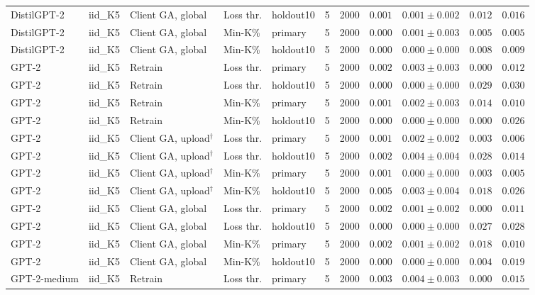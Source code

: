 \begin{table}[t]
\begin{tabular*}{\textwidth}{@{\extracolsep{\fill}}lllllcccccc@{}}
DistilGPT-2 & iid\_K5 & Client GA, global & Loss thr. & holdout10 & 5 & 2000 & $0.001$ & $0.001 \pm 0.002$ & $0.012$ & $0.016$ \\
DistilGPT-2 & iid\_K5 & Client GA, global & Min-K\% & primary & 5 & 2000 & $0.000$ & $0.001 \pm 0.003$ & $0.005$ & $0.005$ \\
DistilGPT-2 & iid\_K5 & Client GA, global & Min-K\% & holdout10 & 5 & 2000 & $0.000$ & $0.000 \pm 0.000$ & $0.008$ & $0.009$ \\
GPT-2 & iid\_K5 & Retrain & Loss thr. & primary & 5 & 2000 & $0.002$ & $0.003 \pm 0.003$ & $0.000$ & $0.012$ \\
GPT-2 & iid\_K5 & Retrain & Loss thr. & holdout10 & 5 & 2000 & $0.000$ & $0.000 \pm 0.000$ & $0.029$ & $0.030$ \\
GPT-2 & iid\_K5 & Retrain & Min-K\% & primary & 5 & 2000 & $0.001$ & $0.002 \pm 0.003$ & $0.014$ & $0.010$ \\
GPT-2 & iid\_K5 & Retrain & Min-K\% & holdout10 & 5 & 2000 & $0.000$ & $0.000 \pm 0.000$ & $0.000$ & $0.026$ \\
GPT-2 & iid\_K5 & Client GA, upload$^{\dagger}$ & Loss thr. & primary & 5 & 2000 & $0.001$ & $0.002 \pm 0.002$ & $0.003$ & $0.006$ \\
GPT-2 & iid\_K5 & Client GA, upload$^{\dagger}$ & Loss thr. & holdout10 & 5 & 2000 & $0.002$ & $0.004 \pm 0.004$ & $0.028$ & $0.014$ \\
GPT-2 & iid\_K5 & Client GA, upload$^{\dagger}$ & Min-K\% & primary & 5 & 2000 & $0.001$ & $0.000 \pm 0.000$ & $0.003$ & $0.005$ \\
GPT-2 & iid\_K5 & Client GA, upload$^{\dagger}$ & Min-K\% & holdout10 & 5 & 2000 & $0.005$ & $0.003 \pm 0.004$ & $0.018$ & $0.026$ \\
GPT-2 & iid\_K5 & Client GA, global & Loss thr. & primary & 5 & 2000 & $0.002$ & $0.001 \pm 0.002$ & $0.000$ & $0.011$ \\
GPT-2 & iid\_K5 & Client GA, global & Loss thr. & holdout10 & 5 & 2000 & $0.000$ & $0.000 \pm 0.000$ & $0.027$ & $0.028$ \\
GPT-2 & iid\_K5 & Client GA, global & Min-K\% & primary & 5 & 2000 & $0.002$ & $0.001 \pm 0.002$ & $0.018$ & $0.010$ \\
GPT-2 & iid\_K5 & Client GA, global & Min-K\% & holdout10 & 5 & 2000 & $0.000$ & $0.000 \pm 0.000$ & $0.004$ & $0.019$ \\
GPT-2-medium & iid\_K5 & Retrain & Loss thr. & primary & 5 & 2000 & $0.003$ & $0.004 \pm 0.003$ & $0.000$ & $0.015$ \\

\end{tabular*}
\end{table}
